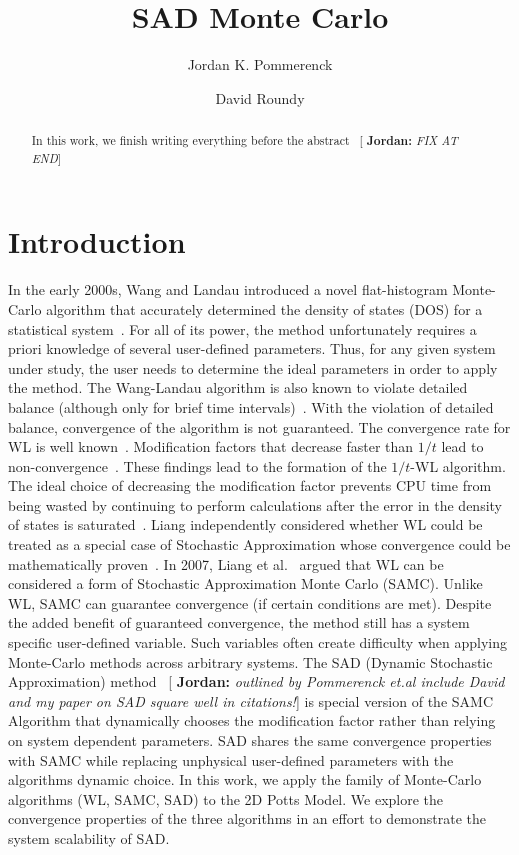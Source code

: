 \documentclass[letterpaper,twocolumn,amsmath,amssymb,pre,aps,10pt]{revtex4-1}
\newcommand{\blue}[1]{{\bf \color{blue} #1}}
\newcommand{\jpsays}[1]{{\color{red} [\blue{Jordan:} \emph{#1}]}}
\begin{document}
\title{SAD Monte Carlo}

\author{Jordan K. Pommerenck}
\author{David Roundy}

\begin{abstract}
In this work, we finish writing everything before the abstract~\jpsays{FIX AT END}
\end{abstract}

\maketitle

\section{Introduction}
In the early 2000s, Wang and Landau introduced a novel flat-histogram
Monte-Carlo algorithm that accurately determined the density of states
(DOS) for a statistical
system~\cite{wang2001determining,wang2001efficient}. For all of its
power, the method unfortunately requires a priori knowledge of several
user-defined parameters. Thus, for any given system under study, the
user needs to determine the ideal parameters in order to apply the
method. The Wang-Landau algorithm is also known to violate detailed
balance (although only for brief time intervals)~\cite{yan2003fast,
shell2002generalization}. With the violation of detailed balance,
convergence of the algorithm is not guaranteed. The convergence rate
for WL is well known~\cite{zhou2005understanding,lee2006convergence,
belardinelli2007wang}. Modification factors that decrease faster than
$1/t$ lead to non-convergence~\cite{belardinelli2007fast}.  These
findings lead to the formation of the $1/t$-WL algorithm.  The ideal
choice of decreasing the modification factor prevents CPU time from
being wasted by continuing to perform calculations after the error in
the density of states is saturated~\cite{belardinelli2008analysis}.
Liang independently considered whether WL could be treated as a special
case of Stochastic Approximation whose convergence could be
mathematically proven~\cite{liang2006theory, liang2007stochastic}. In
2007, Liang et al.~\cite{liang2007stochastic} argued that WL can be
considered a form of Stochastic Approximation Monte Carlo (SAMC).
Unlike WL, SAMC can guarantee convergence (if certain conditions are
met). Despite the added benefit of guaranteed convergence, the method
still has a system specific user-defined variable. Such variables often
create difficulty when applying Monte-Carlo methods across arbitrary
systems.  The SAD (Dynamic Stochastic Approximation)
method~\jpsays{outlined by Pommerenck et.al include David and my paper
on SAD square well in citations!} is special version of the SAMC
Algorithm that dynamically chooses the modification factor rather than
relying on system dependent parameters. SAD shares the same convergence
properties with SAMC while replacing unphysical user-defined parameters
with the algorithms dynamic choice.  In this work, we apply the family
of Monte-Carlo algorithms (WL, SAMC, SAD) to the 2D Potts Model. We
explore the convergence properties of the three algorithms in an effort
to demonstrate the system scalability of SAD.
\end{document}
